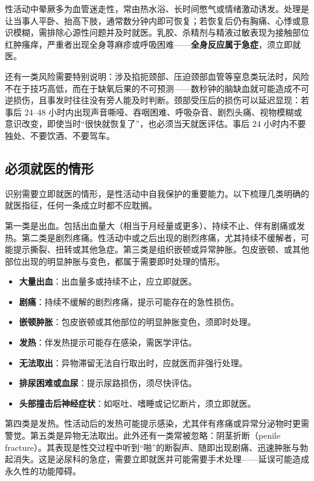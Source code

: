 \documentclass[12pt,UTF8]{ctexbook}
\newcommand{\keyword}[1]{\textbf{#1}}
\begin{document}
性活动中晕厥多为血管迷走性，常由热水浴、长时间憋气或情绪激动诱发。处理是让当事人平卧、抬高下肢，通常数分钟内即可恢复；若恢复后仍有胸痛、心悸或意识模糊，需排除心源性问题并及时就医。乳胶、杀精剂与精液过敏表现为接触部位红肿瘙痒，严重者出现全身荨麻疹或呼吸困难——\keyword{全身反应属于急症}，须立即就医。

还有一类风险需要特别说明：涉及掐扼颈部、压迫颈部血管等窒息类玩法时，风险不在于技巧高低，而在于缺氧后果的不可预测——数秒钟的脑缺血就可能造成不可逆损伤，且事发时往往没有旁人能及时判断。颈部受压后的损伤可以延迟显现：若事后 24--48 小时内出现声音嘶哑、吞咽困难、呼吸杂音、剧烈头痛、视物模糊或意识改变，即使当时“很快就恢复了”，也必须当天就医评估。事后 24 小时内不要独处、不要饮酒、不要驾车。

\subsection{必须就医的情形}

识别需要立即就医的情形，是性活动中自我保护的重要能力。以下梳理几类明确的就医指征，任何一条成立时都不应耽搁。

第一类是出血。包括出血量大（相当于月经量或更多）、持续不止、伴有剧痛或发热。第二类是剧烈疼痛。性活动中或之后出现的剧烈疼痛，尤其持续不缓解者，可能提示撕裂、扭转或其他急症。第三类是组织嵌顿或异常肿胀。包皮嵌顿、或其他部位出现的明显肿胀与变色，都属于需要即时处理的情形。

\begin{itemize}
  \item \keyword{大量出血}：出血量多或持续不止，应立即就医。
  \item \keyword{剧痛}：持续不缓解的剧烈疼痛，提示可能存在的急性损伤。
  \item \keyword{嵌顿肿胀}：包皮嵌顿或其他部位的明显肿胀变色，须即时处理。
  \item \keyword{发热}：伴发热提示可能存在感染，需医学评估。
  \item \keyword{无法取出}：异物滞留无法自行取出时，应就医而非强行处理。
  \item \keyword{排尿困难或血尿}：提示尿路损伤，须尽快评估。
  \item \keyword{头部撞击后神经症状}：如呕吐、嗜睡或记忆断片，须立即就医。
\end{itemize}

第四类是发热。性活动后的发热可能提示感染，尤其伴有疼痛或异常分泌物时更需警觉。第五类是异物无法取出。此外还有一类常被忽略：阴茎折断（penile fracture）。其表现是性交过程中听到“啪”的断裂声、随即出现剧痛、迅速肿胀与勃起消失。这是泌尿科的急症，需要立即就医并可能需要手术处理——延误可能造成永久性的功能障碍。
\end{document}
